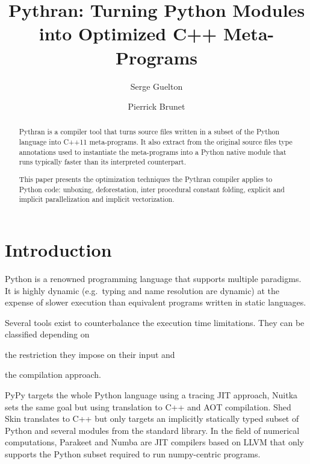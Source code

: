 \documentclass{llncs}
\title{Pythran: Turning Python Modules into Optimized C++ Meta-Programs}
\author{Serge Guelton\inst{1,2} \and Pierrick Brunet\inst{2}}
\institute{École Normale Supérieure, Département d'Informatique, Paris, France
\and
Télécom Bretagne, Plouzané, France
}
\begin{document}
\maketitle

\begin{abstract}

    Pythran is a compiler tool that turns source files written in a subset of
    the Python language into C++11 meta-programs. It also extract from the
    original source files type annotations used to instantiate the meta-programs
    into a Python native module that runs typically faster than its interpreted
    counterpart.

    This paper presents the optimization techniques the Pythran compiler applies
    to Python code: unboxing, deforestation, inter procedural constant folding,
    explicit and implicit parallelization and implicit vectorization.

\end{abstract}

\section{Introduction}

Python is a renowned programming language that supports multiple paradigms. It
is highly dynamic (e.g.\ typing and name resolution are dynamic) at the expense
of slower execution than equivalent programs written in static languages.

Several tools exist to counterbalance the execution time limitations. They can
be classified depending on
\begin{inparaenum}[1)]
\item the restriction they impose on their input and
\item the compilation approach.
\end{inparaenum}
PyPy\cite{pypy2009} targets the whole Python
language using a tracing \ac{JIT} approach, Nuitka\cite{nuitka2012} sets the same
goal but using translation to C++ and \ac{AOT} compilation. Shed
Skin\cite{shedskin2006} translates to C++ but only targets an implicitly statically
typed subset of Python and several modules from the standard library. In the
field of numerical computations, Parakeet\cite{parakeet2012} and
Numba\cite{numba2013} are \ac{JIT} compilers based on LLVM that
only supports the Python subset required to run numpy-centric programs.
\end{document}
